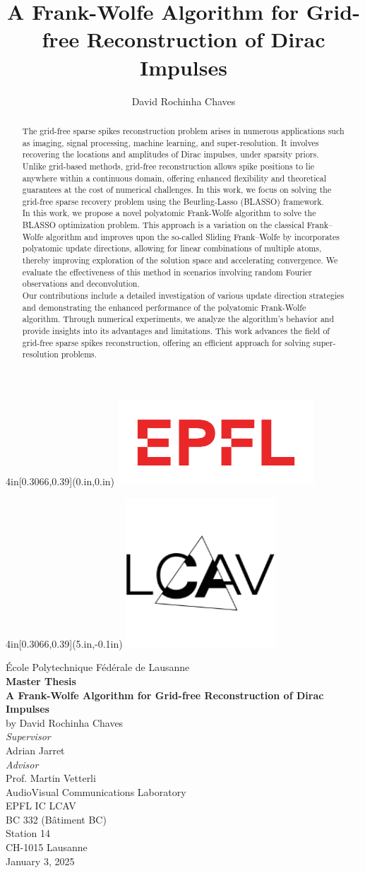 \documentclass[a4paper,12pt,oneside]{report}
\title{A Frank-Wolfe Algorithm for Grid-free Reconstruction of Dirac Impulses}
\author{David Rochinha Chaves}
\theoremstyle{named}
\def\maketitle{
\newlength{\drop}
\newlength{\tpheight}\setlength{\tpheight}{0.9\textheight}
\newlength{\txtheight}\setlength{\txtheight}{0.9\tpheight}
\begingroup
\thispagestyle{empty}
\drop=0.1\txtheight
\begin{textblock*}{4in}[0.3066,0.39](0.in,0.in)
    \includegraphics[width=2.9in]{EPFLlogo}
\end{textblock*}
\begin{textblock*}{4in}[0.3066,0.39](5.in,-0.1in)
    \includegraphics[width=2.2in]{LABlogo}
\end{textblock*}
\vspace{1.5in}
\centering 
{\Large \rmfamily École Polytechnique Fédérale de Lausanne}\\[2\baselineskip]
{\Large \textbf{\textrm{Master Thesis}}}\\
[3\baselineskip]
{\LARGE \textbf{\textsf{A Frank-Wolfe Algorithm for Grid-free Reconstruction of Dirac Impulses}}}\\[1\baselineskip] 
\large \textsf{by David Rochinha Chaves}\\
[2.5\baselineskip]
\textit{Supervisor} \\
Adrian Jarret \\
[1\baselineskip]
\textit{Advisor} \\
Prof. Martin Vetterli\\
[2\baselineskip]
\centering
AudioVisual Communications Laboratory \\
EPFL IC LCAV \\
BC 332 (Bâtiment BC) \\
Station 14 \\
CH-1015 Lausanne \\[\baselineskip]
\centering
January 3, 2025

\endgroup
}
\begin{document}
\maketitle

\begin{abstract}

The grid-free sparse spikes reconstruction problem arises in numerous applications such as imaging, signal processing, machine learning, and super-resolution. It involves recovering the locations and amplitudes of Dirac impulses, under sparsity priors. Unlike grid-based methods, grid-free reconstruction allows spike positions to lie anywhere within a continuous domain, offering enhanced flexibility and theoretical guarantees at the cost of numerical challenges. In this work, we focus on solving the grid-free sparse recovery problem using the Beurling-Lasso (BLASSO) framework.\\

In this work, we propose a novel polyatomic Frank-Wolfe algorithm to solve the BLASSO optimization problem. This approach is a variation on the classical Frank–Wolfe algorithm and improves upon the so-called Sliding Frank–Wolfe by incorporates polyatomic update directions, allowing for linear combinations of multiple atoms, thereby improving exploration of the solution space and accelerating convergence. We evaluate the effectiveness of this method in scenarios involving random Fourier observations and deconvolution.\\

Our contributions include a detailed investigation of various update direction strategies and demonstrating the enhanced performance of the polyatomic Frank-Wolfe algorithm. Through numerical experiments, we analyze the algorithm’s behavior and provide insights into its advantages and limitations. This work advances the field of grid-free sparse spikes reconstruction, offering an efficient approach for solving super-resolution problems.

\end{abstract}

\tableofcontents
\end{document}
